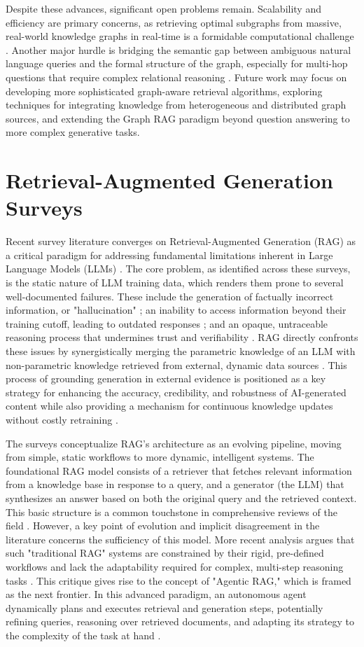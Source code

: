 \documentclass[11pt]{article}
\begin{document}
Despite these advances, significant open problems remain. Scalability and efficiency are primary concerns, as retrieving optimal subgraphs from massive, real-world knowledge graphs in real-time is a formidable computational challenge \cite{ref18}. Another major hurdle is bridging the semantic gap between ambiguous natural language queries and the formal structure of the graph, especially for multi-hop questions that require complex relational reasoning . Future work may focus on developing more sophisticated graph-aware retrieval algorithms, exploring techniques for integrating knowledge from heterogeneous and distributed graph sources, and extending the Graph RAG paradigm beyond question answering to more complex generative tasks.

\section{Retrieval-Augmented Generation Surveys}
Recent survey literature converges on Retrieval-Augmented Generation (RAG) as a critical paradigm for addressing fundamental limitations inherent in Large Language Models (LLMs) . The core problem, as identified across these surveys, is the static nature of LLM training data, which renders them prone to several well-documented failures. These include the generation of factually incorrect information, or "hallucination" \cite{ref2}; an inability to access information beyond their training cutoff, leading to outdated responses ; and an opaque, untraceable reasoning process that undermines trust and verifiability \cite{ref2}. RAG directly confronts these issues by synergistically merging the parametric knowledge of an LLM with non-parametric knowledge retrieved from external, dynamic data sources \cite{ref2}. This process of grounding generation in external evidence is positioned as a key strategy for enhancing the accuracy, credibility, and robustness of AI-generated content \cite{ref19}while also providing a mechanism for continuous knowledge updates without costly retraining \cite{ref2}.

The surveys conceptualize RAG's architecture as an evolving pipeline, moving from simple, static workflows to more dynamic, intelligent systems. The foundational RAG model consists of a retriever that fetches relevant information from a knowledge base in response to a query, and a generator (the LLM) that synthesizes an answer based on both the original query and the retrieved context. This basic structure is a common touchstone in comprehensive reviews of the field . However, a key point of evolution and implicit disagreement in the literature concerns the sufficiency of this model. More recent analysis argues that such "traditional RAG" systems are constrained by their rigid, pre-defined workflows and lack the adaptability required for complex, multi-step reasoning tasks \cite{ref20}. This critique gives rise to the concept of "Agentic RAG," which is framed as the next frontier. In this advanced paradigm, an autonomous agent dynamically plans and executes retrieval and generation steps, potentially refining queries, reasoning over retrieved documents, and adapting its strategy to the complexity of the task at hand \cite{ref20}.
\end{document}
